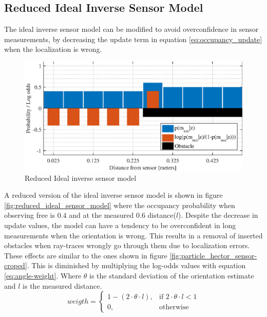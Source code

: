 
\subsection{Reduced Ideal Inverse Sensor Model}
\label{sec:reduced_ideal_sensor_model}
The ideal inverse sensor model can be modified to avoid overconfidence in sensor measurements, by decreasing the update term in equation \ref{eq:occupancy_update} when the localization is wrong. 

\begin{figure}[htbp]
	\centering
	\includegraphics[scale=1]{figures/static_mapping/reduced_ideal_sensor_model}
	\caption{Reduced Ideal inverse sensor model}
	\label{fig:reduced_ideal_sensor_model}
\end{figure}

A reduced version of the ideal inverse sensor model is shown in figure \vref{fig:reduced_ideal_sensor_model} where the occupancy probability when observing free is $0.4$ and at the measured $0.6$ distance($l$). 
Despite the decrease in update values, the model can have a tendency to be overconfident in long measurements when the orientation is wrong.
This results in a removal of inserted obstacles when ray-traces wrongly go through them due to localization errors.
These effects are similar to the ones shown in figure \ref{fig:particle_hector_sensor-croped}.
This is diminished by multiplying the log-odds values with equation \vref{eq:angle-weight}.
Where \(\theta \) is the standard deviation of the orientation estimate and \(l\) is the measured distance.
\begin{equation}
\label{eq:angle-weight}
weigth = 
\begin{cases}
1 - ( 2 \cdot \theta \cdot l ), & \text{if } 2 \cdot \theta \cdot l < 1\\
0, & \text{otherwise}
\end{cases}
\end{equation}

